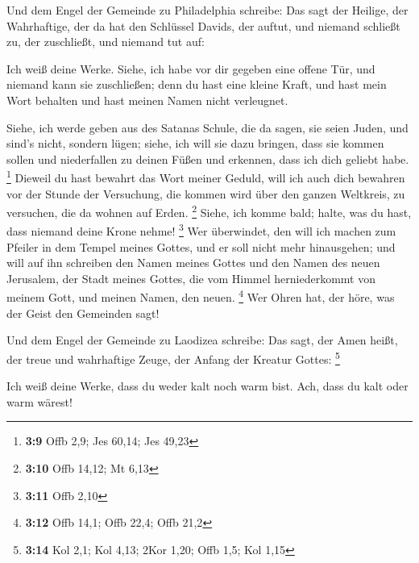  Und dem Engel der Gemeinde zu Philadelphia schreibe: Das
sagt der Heilige, der Wahrhaftige, der da hat den Schlüssel Davids, der
auftut, und niemand schließt zu, der zuschließt, und niemand tut auf:

 Ich weiß deine Werke. Siehe, ich habe vor dir gegeben
eine offene Tür, und niemand kann sie zuschließen; denn du hast eine
kleine Kraft, und hast mein Wort behalten und hast meinen Namen nicht
verleugnet.

 Siehe, ich werde geben aus des Satanas Schule, die da
sagen, sie seien Juden, und sind's nicht, sondern lügen; siehe, ich will
sie dazu bringen, dass sie kommen sollen und niederfallen zu deinen
Füßen und erkennen, dass ich dich geliebt habe. \footnote{\textbf{3:9}
  Offb 2,9; Jes 60,14; Jes 49,23}  Dieweil du hast
bewahrt das Wort meiner Geduld, will ich auch dich bewahren vor der
Stunde der Versuchung, die kommen wird über den ganzen Weltkreis, zu
versuchen, die da wohnen auf Erden. \footnote{\textbf{3:10} Offb 14,12;
  Mt 6,13}  Siehe, ich komme bald; halte, was du hast,
dass niemand deine Krone nehme! \footnote{\textbf{3:11} Offb 2,10}
 Wer überwindet, den will ich machen zum Pfeiler in dem
Tempel meines Gottes, und er soll nicht mehr hinausgehen; und will auf
ihn schreiben den Namen meines Gottes und den Namen des neuen Jerusalem,
der Stadt meines Gottes, die vom Himmel herniederkommt von meinem Gott,
und meinen Namen, den neuen. \footnote{\textbf{3:12} Offb 14,1; Offb
  22,4; Offb 21,2}  Wer Ohren hat, der höre, was der
Geist den Gemeinden sagt!

 Und dem Engel der Gemeinde zu Laodizea schreibe: Das
sagt, der Amen heißt, der treue und wahrhaftige Zeuge, der Anfang der
Kreatur Gottes: \footnote{\textbf{3:14} Kol 2,1; Kol 4,13; 2Kor 1,20;
  Offb 1,5; Kol 1,15}

 Ich weiß deine Werke, dass du weder kalt noch warm bist.
Ach, dass du kalt oder warm wärest!

